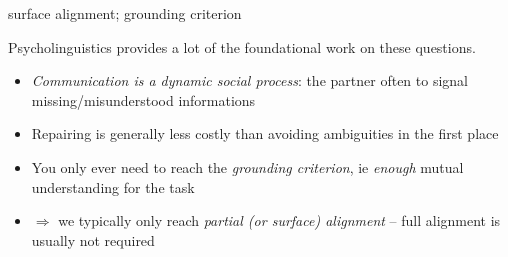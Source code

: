 \documentclass[compress]{beamer}
\begin{document}



{
\begin{frame}{surface alignment; grounding criterion}

    Psycholinguistics provides a lot of the foundational work on these
    questions.

    \begin{itemize}
        \item<+-> \emph{Communication is a dynamic social process}: the partner often to signal
            missing/misunderstood informations
        \item<+-> Repairing is generally less costly than avoiding ambiguities in
            the first place
        \item<+-> You only ever need to reach the \emph{grounding criterion}, ie
            \emph{enough} mutual understanding for the task
        \item<+-> $\Rightarrow$ we typically only reach \emph{partial (or surface)
            alignment} -- full alignment is usually not required
    \end{itemize}
\end{frame}
}
\end{document}
